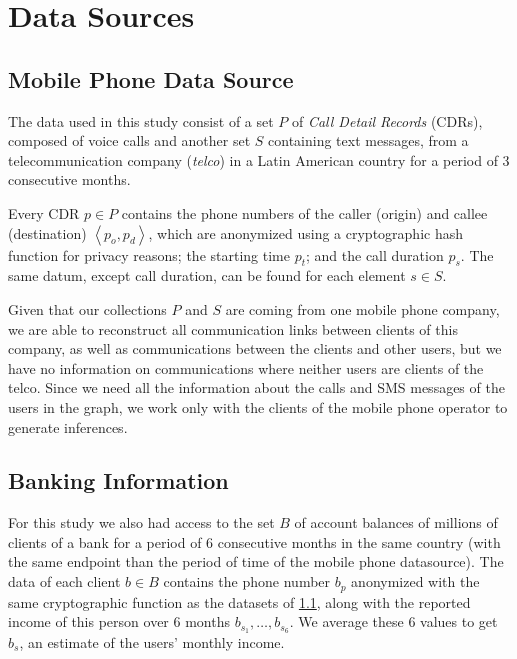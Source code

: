 
\section{Data Sources}
\label{sec:data_sources}

\subsection{Mobile Phone Data Source}
\label{subsec:telcoinformation}

The data used in this study consist of a set $P$ of \textit{Call Detail Records} (CDRs), composed of voice calls and another set $S$ containing text messages, from a telecommunication company (\textit{telco}) in a Latin American country for a period of 3 consecutive months.

Every CDR $p \in P$ contains the phone numbers of the caller (origin) and callee (destination) $\left< p_o, p_d \right>$, which are anonymized using a cryptographic hash function for privacy reasons; the starting time \( p_t \); and the call duration \( p_s \). The same datum, except call duration, can be found for each element $s \in S$.

Given that our collections $P$ and $S$ are coming from one mobile phone company, we are able to reconstruct all communication links between clients of this company, as well as communications between the clients and other users, but we have no information on communications where neither users are clients of the telco. Since we need all the information about the calls and SMS messages of the users in the graph, we work only with the clients of the mobile phone operator to generate inferences.

\subsection{Banking Information}

For this study we also had access to the set $B$ of account balances of millions of clients of a bank for a period of 6 consecutive months in the same country (with the same endpoint than the period of time %
of the mobile phone datasource).
The data of each client $b \in B$ contains the phone number $b_p$ anonymized with the same cryptographic function as the datasets of \cref{subsec:telcoinformation}, along with the reported income of this person over 6 months $b_{s_1}, \ldots, b_{s_6}$. We average these 6 values to get $b_s$, an estimate of the users' monthly income.


